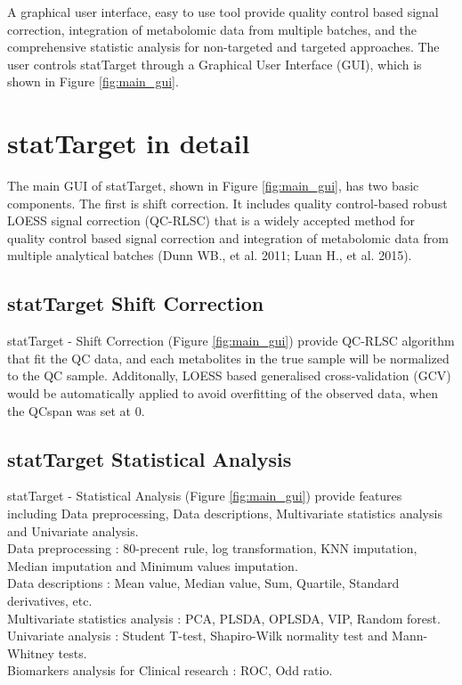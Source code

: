 \documentclass[english]{article}
\begin{document}
A graphical user interface, easy to use tool provide quality control based signal correction, integration of metabolomic data from multiple batches, and the comprehensive statistic analysis for non-targeted and targeted approaches. The user controls statTarget through a Graphical User Interface (GUI), which 
is shown in Figure \ref{fig:main_gui}. 


\section[statTarget in detail]{statTarget in detail}


The main GUI of statTarget, shown in Figure \ref{fig:main_gui},
has two basic components. The first is shift correction. It includes quality control-based robust LOESS signal correction (QC-RLSC) that is a widely accepted method for quality control based signal correction and integration of metabolomic data from multiple analytical batches (Dunn WB., et al. 2011; Luan H., et al. 2015).\\ 

\subsection[statTarget Shift Correction]{statTarget Shift Correction}

statTarget - Shift Correction (Figure \ref{fig:main_gui}) provide QC-RLSC algorithm that fit the QC data, and each metabolites in the true sample will be normalized to the QC sample. Additonally, LOESS based generalised cross-validation (GCV) would be automatically applied to avoid overfitting of the observed data, when the QCspan was set at 0.\\ 

\subsection[statTarget Statistical Analysis]{statTarget Statistical Analysis}

statTarget - Statistical Analysis (Figure \ref{fig:main_gui}) provide features including Data preprocessing, Data descriptions, Multivariate statistics analysis and Univariate analysis.\\
Data preprocessing : 80-precent rule, log transformation, KNN imputation, Median imputation and Minimum values imputation.\\
Data descriptions :  Mean value, Median value, Sum, Quartile, Standard derivatives, etc.\\
Multivariate statistics analysis : PCA, PLSDA, OPLSDA, VIP, Random forest.
Univariate analysis : Student T-test, Shapiro-Wilk normality test and Mann-Whitney tests.\\
Biomarkers analysis for Clinical research : ROC, Odd ratio.
\end{document}
